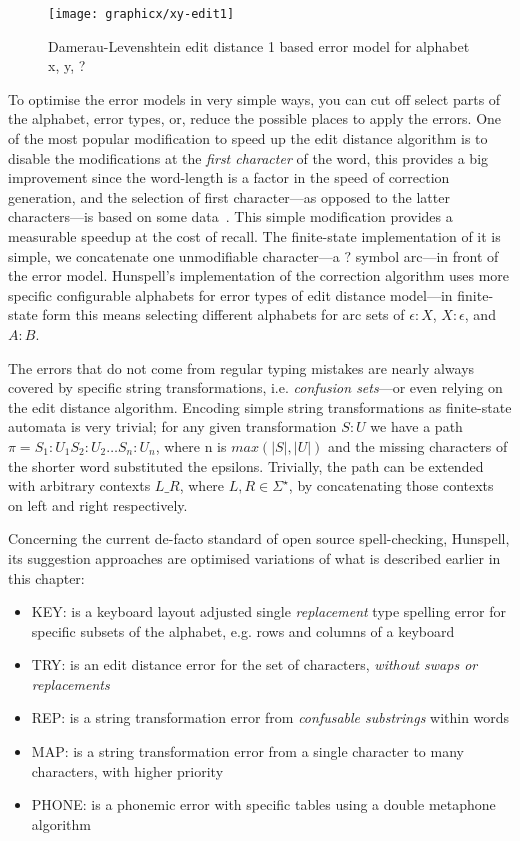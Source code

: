 \documentclass[a4paper,12pt]{article}
\begin{document}
\begin{figure}
    \centering
    \texttt{[image: graphicx/xy-edit1]}
    \caption{Damerau-Levenshtein edit distance 1 based error model for
        alphabet {x, y, ?}
    \label{fig:xy-edit-1}}
\end{figure}

To optimise the error models in very simple ways, you can cut off select parts
of the alphabet, error types, or, reduce the possible places to apply the
errors.  One of the most popular modification to speed up the edit distance
algorithm is to disable the modifications at the \emph{first character} of the
word, this provides a big improvement since the word-length is a factor in the
speed of correction generation, and the selection of first character---as
opposed to the latter characters---is based on some
data~\cite[]{bhagat2007spelling}.  This simple modification provides a
measurable speedup at the cost of recall. The finite-state implementation of it
is simple, we concatenate one unmodifiable character---a $?$ symbol arc---in
front of the error model.  Hunspell's implementation of the correction
algorithm uses more specific configurable alphabets for error types of edit
distance model---in finite-state form this means selecting different alphabets
for arc sets of $\epsilon:X$, $X:\epsilon$, and $A:B$.

The errors that do not come from regular typing mistakes are
nearly always covered by specific string transformations, i.e.
\emph{confusion sets}---or even relying on the edit distance algorithm.
Encoding simple string transformations as finite-state automata is very
trivial; for any given transformation $S:U$ we have a path $\pi = S_1:U_1
S_2:U_2 \ldots S_n:U_n$, where n is $max(|S|, |U|)$ and the missing characters
of the shorter word substituted the epsilons.  Trivially, the path can be
extended with arbitrary contexts $L \_ R$, where $L, R \in \Sigma^{\star}$, by
concatenating those contexts on left and right respectively. 

Concerning the current de-facto standard of open source spell-checking,
Hunspell, its suggestion approaches are optimised variations of what is
described earlier in this chapter:

\begin{itemize}
    \item KEY: is a keyboard layout adjusted single \emph{replacement} type
        spelling error for specific subsets of the alphabet, e.g. rows and 
        columns of a keyboard
    \item TRY: is an edit distance error for the set of characters, 
        \emph{without swaps or replacements}
    \item REP: is a string transformation error from \emph{confusable
        substrings} within words
    \item MAP: is a string transformation error from a single character to 
        many characters, with higher priority
    \item PHONE: is a phonemic error with specific tables using a double
        metaphone algorithm
\end{itemize}
\end{document}

